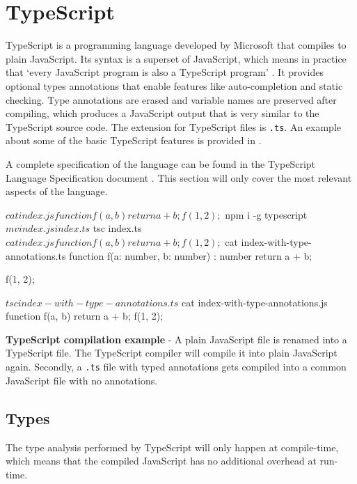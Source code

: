 \section{TypeScript} \label{sec:background-typescript}
TypeScript is a programming language developed by Microsoft that compiles to plain JavaScript. Its syntax is a superset of JavaScript, which means in practice that `every JavaScript program is also a TypeScript program' \citep{typescript}. It provides optional types annotations that enable features like auto-completion and static checking. Type annotations are erased and variable names are preserved after compiling, which produces a JavaScript output that is very similar to the TypeScript source code. The extension for TypeScript files is \texttt{.ts}. An example about some of the basic TypeScript features is provided in .

A complete specification of the language can be found in the TypeScript Language Specification document \citep{typescript}. This section will only cover the most relevant aspects of the language.

\begin{code}
	\begin{bashinline}
$ cat index.js 
function f(a, b) {
	return a + b;
}

f(1, 2);

$ npm i -g typescript
$ mv index.js index.ts
$ tsc index.ts
$ cat index.js
function f(a, b) {
    return a + b;
}
f(1, 2);

$ cat index-with-type-annotations.ts
function f(a: number, b: number) : number {
	return a + b;
}

f(1, 2);

$ tsc index-with-type-annotations.ts
$ cat index-with-type-annotations.js
function f(a, b) {
    return a + b;
}
f(1, 2);
	  \end{bashinline}
	\caption[TypeScript compilation example]{\textbf{TypeScript compilation example} - A plain JavaScript file is renamed into a TypeScript file. The TypeScript compiler will compile it into plain JavaScript again. Secondly, a \texttt{.ts} file with typed annotations gets compiled into a common JavaScript file with no annotations.}
	\label{code:background-typescript-and-javascript}
  \end{code}

\subsection{Types}
The type analysis performed by TypeScript will only happen at compile-time, which means that the compiled JavaScript has no additional overhead at run-time.

